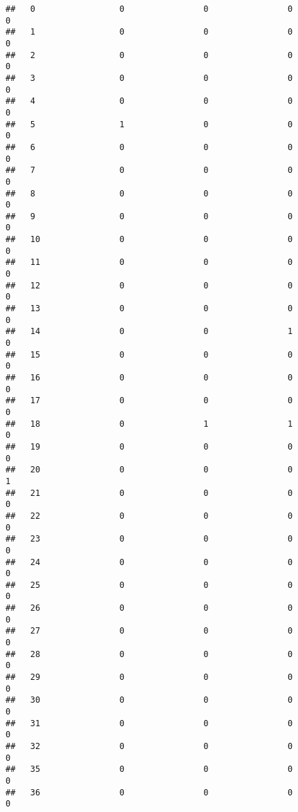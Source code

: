 \documentclass[]{article}
\begin{document}
\begin{verbatim}
##   0                 0                0                0                0
##   1                 0                0                0                0
##   2                 0                0                0                0
##   3                 0                0                0                0
##   4                 0                0                0                0
##   5                 1                0                0                0
##   6                 0                0                0                0
##   7                 0                0                0                0
##   8                 0                0                0                0
##   9                 0                0                0                0
##   10                0                0                0                0
##   11                0                0                0                0
##   12                0                0                0                0
##   13                0                0                0                0
##   14                0                0                1                0
##   15                0                0                0                0
##   16                0                0                0                0
##   17                0                0                0                0
##   18                0                1                1                0
##   19                0                0                0                0
##   20                0                0                0                1
##   21                0                0                0                0
##   22                0                0                0                0
##   23                0                0                0                0
##   24                0                0                0                0
##   25                0                0                0                0
##   26                0                0                0                0
##   27                0                0                0                0
##   28                0                0                0                0
##   29                0                0                0                0
##   30                0                0                0                0
##   31                0                0                0                0
##   32                0                0                0                0
##   35                0                0                0                0
##   36                0                0                0                0

\end{verbatim}
\end{document}
